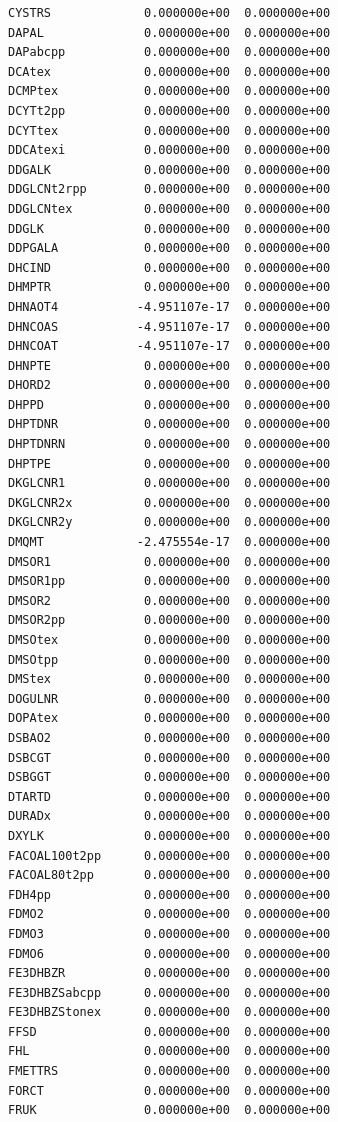 \documentclass{scrartcl}
\begin{document}
\begin{enumerate}
\begin{lstlisting}
CYSTRS             0.000000e+00  0.000000e+00
DAPAL              0.000000e+00  0.000000e+00
DAPabcpp           0.000000e+00  0.000000e+00
DCAtex             0.000000e+00  0.000000e+00
DCMPtex            0.000000e+00  0.000000e+00
DCYTt2pp           0.000000e+00  0.000000e+00
DCYTtex            0.000000e+00  0.000000e+00
DDCAtexi           0.000000e+00  0.000000e+00
DDGALK             0.000000e+00  0.000000e+00
DDGLCNt2rpp        0.000000e+00  0.000000e+00
DDGLCNtex          0.000000e+00  0.000000e+00
DDGLK              0.000000e+00  0.000000e+00
DDPGALA            0.000000e+00  0.000000e+00
DHCIND             0.000000e+00  0.000000e+00
DHMPTR             0.000000e+00  0.000000e+00
DHNAOT4           -4.951107e-17  0.000000e+00
DHNCOAS           -4.951107e-17  0.000000e+00
DHNCOAT           -4.951107e-17  0.000000e+00
DHNPTE             0.000000e+00  0.000000e+00
DHORD2             0.000000e+00  0.000000e+00
DHPPD              0.000000e+00  0.000000e+00
DHPTDNR            0.000000e+00  0.000000e+00
DHPTDNRN           0.000000e+00  0.000000e+00
DHPTPE             0.000000e+00  0.000000e+00
DKGLCNR1           0.000000e+00  0.000000e+00
DKGLCNR2x          0.000000e+00  0.000000e+00
DKGLCNR2y          0.000000e+00  0.000000e+00
DMQMT             -2.475554e-17  0.000000e+00
DMSOR1             0.000000e+00  0.000000e+00
DMSOR1pp           0.000000e+00  0.000000e+00
DMSOR2             0.000000e+00  0.000000e+00
DMSOR2pp           0.000000e+00  0.000000e+00
DMSOtex            0.000000e+00  0.000000e+00
DMSOtpp            0.000000e+00  0.000000e+00
DMStex             0.000000e+00  0.000000e+00
DOGULNR            0.000000e+00  0.000000e+00
DOPAtex            0.000000e+00  0.000000e+00
DSBAO2             0.000000e+00  0.000000e+00
DSBCGT             0.000000e+00  0.000000e+00
DSBGGT             0.000000e+00  0.000000e+00
DTARTD             0.000000e+00  0.000000e+00
DURADx             0.000000e+00  0.000000e+00
DXYLK              0.000000e+00  0.000000e+00
FACOAL100t2pp      0.000000e+00  0.000000e+00
FACOAL80t2pp       0.000000e+00  0.000000e+00
FDH4pp             0.000000e+00  0.000000e+00
FDMO2              0.000000e+00  0.000000e+00
FDMO3              0.000000e+00  0.000000e+00
FDMO6              0.000000e+00  0.000000e+00
FE3DHBZR           0.000000e+00  0.000000e+00
FE3DHBZSabcpp      0.000000e+00  0.000000e+00
FE3DHBZStonex      0.000000e+00  0.000000e+00
FFSD               0.000000e+00  0.000000e+00
FHL                0.000000e+00  0.000000e+00
FMETTRS            0.000000e+00  0.000000e+00
FORCT              0.000000e+00  0.000000e+00
FRUK               0.000000e+00  0.000000e+00

\end{lstlisting}
\end{enumerate}
\end{document}
